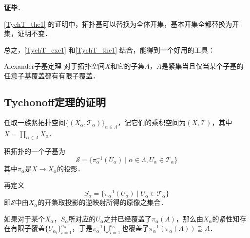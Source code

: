 \textbf{证毕}．



\autoref{TychT_the1} 的证明中，拓扑基可以替换为全体开集，基本开集全都替换为开集，证明不变．

总之，\autoref{TychT_exe1} 和\autoref{TychT_the1} 结合，能得到一个好用的工具：

\begin{corollary}{Alexander子基定理}
对于拓扑空间$X$和它的子集$A$，$A$是紧集当且仅当某个子基的任意子基覆盖都有有限子覆盖．
\end{corollary}




\subsection{Tychonoff定理的证明}

任取一族紧拓扑空间$\{(X_\alpha, \mathcal{T}_\alpha)\}_{\alpha\in \Lambda}$，记它们的乘积空间为$(X, \mathcal{T})$，其中$X=\prod_{\alpha\in\Lambda}X_\alpha$．

积拓扑的一个子基为
\begin{equation}
\mathcal{S} = \{\pi_\alpha^{-1}(U_\alpha)\mid \alpha\in\Lambda, U_\alpha\in \mathcal{T}_\alpha\}
\end{equation}
其中$\pi_\alpha$是$X\to X_\alpha$的投影．

再定义
\begin{equation}
S_\alpha = \{\pi_\alpha^{-1}(U_\alpha)\mid U_\alpha\in \mathcal{T}_\alpha\}
\end{equation}
即$\mathcal{S}$中由$X_\alpha$的开集取投影的逆映射所得的原像之集合．

如果对于某个$X_\alpha$，$S_\alpha$所对应的$U_\alpha$之并已经覆盖了$\pi_\alpha(A)$，那么由$X_\alpha$的紧性知存在有限子覆盖$\{U_{\alpha_i}\}_{i=1}^{n_\alpha}$，于是$\pi_\alpha^{-1}\bigcup_{i=1}^{n_\alpha}$也覆盖了$\pi_\alpha^{-1}(\pi_\alpha(A))\supseteq A$．


















